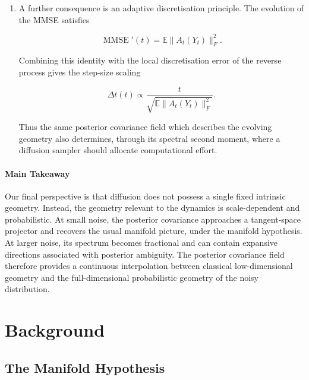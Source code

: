 \documentclass{article}
\newcommand{\E}{\mathbb{E}}
\newcommand{\amb}{\mathcal{A}}
\theoremstyle{plain}
\theoremstyle{definition}
\theoremstyle{remark}
\begin{document}
\begin{enumerate}
    $$
        \amb(t)
        =
        \E\sum_i(a_i-1)_+^2,
    $$
    
    which isolates directions in which posterior uncertainty exceeds the injected noise scale.

    \item 

    A further consequence is an adaptive discretisation principle. The evolution of the MMSE satisfies
    
    $$
        \operatorname{MMSE}'(t)
        =
        \E\|A_t(Y_t)\|_F^2.
    $$
    
    Combining this identity with the local discretisation error of the reverse process gives the step-size scaling
    
    $$
        \Delta t(t)
        \propto
        \frac{t}
        {\sqrt{\E\|A_t(Y_t)\|_F^2}}.
    $$
    
    Thus the same posterior covariance field which describes the evolving geometry also determines, through its spectral second moment, where a diffusion sampler should allocate computational effort.
\end{enumerate}






\paragraph{Main Takeaway} Our final perspective is that diffusion does not possess a single fixed intrinsic geometry. Instead, the geometry relevant to the dynamics is scale-dependent and probabilistic. At small noise, the posterior covariance approaches a tangent-space projector and recovers the usual manifold picture, under the manifold hypothesis. At larger noise, its spectrum becomes fractional and can contain expansive directions associated with posterior ambiguity. The posterior covariance field therefore provides a continuous interpolation between classical low-dimensional geometry and the full-dimensional probabilistic geometry of the noisy distribution.

\newpage


\section{Background}
\label{sec:background}

\subsection{The Manifold Hypothesis}
\end{document}
